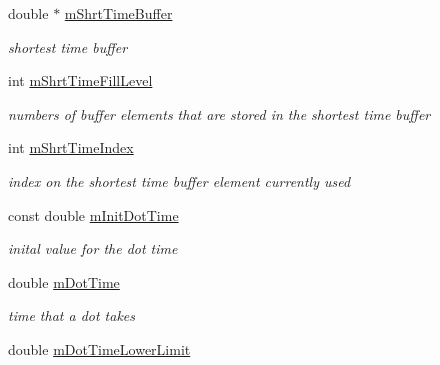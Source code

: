 \begin{DoxyCompactItemize}
\mbox{\label{classMorseDecode_aa78889495de02583dbdcad91e83e7605}} 
double $\ast$ \hyperlink{classMorseDecode_aa78889495de02583dbdcad91e83e7605}{m\+Shrt\+Time\+Buffer}
\begin{DoxyCompactList}\small\item\em shortest time buffer \end{DoxyCompactList}\item 
\mbox{\label{classMorseDecode_a381a601a71f13f5d56ceac4dbdcbc3b2}} 
int \hyperlink{classMorseDecode_a381a601a71f13f5d56ceac4dbdcbc3b2}{m\+Shrt\+Time\+Fill\+Level}
\begin{DoxyCompactList}\small\item\em numbers of buffer elements that are stored in the shortest time buffer \end{DoxyCompactList}\item 
\mbox{\label{classMorseDecode_a70662d108d5f273d2138b13fa5d2037f}} 
int \hyperlink{classMorseDecode_a70662d108d5f273d2138b13fa5d2037f}{m\+Shrt\+Time\+Index}
\begin{DoxyCompactList}\small\item\em index on the shortest time buffer element currently used \end{DoxyCompactList}\item 
\mbox{\label{classMorseDecode_a4030227d90847f82a40bf923ca4d16c8}} 
const double \hyperlink{classMorseDecode_a4030227d90847f82a40bf923ca4d16c8}{m\+Init\+Dot\+Time}
\begin{DoxyCompactList}\small\item\em inital value for the dot time \end{DoxyCompactList}\item 
\mbox{\label{classMorseDecode_a00a7ac701a0620c64bd04004037a88b0}} 
double \hyperlink{classMorseDecode_a00a7ac701a0620c64bd04004037a88b0}{m\+Dot\+Time}
\begin{DoxyCompactList}\small\item\em time that a dot takes \end{DoxyCompactList}\item 
\mbox{\label{classMorseDecode_a9cf9d364339cdbb95e6c10cb57816119}} 
double \hyperlink{classMorseDecode_a9cf9d364339cdbb95e6c10cb57816119}{m\+Dot\+Time\+Lower\+Limit}

\end{DoxyCompactItemize}
